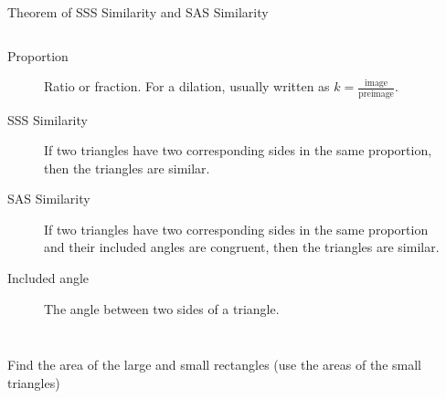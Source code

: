 \documentclass[onlytextwidth, aspectratio=169]{beamer}
\begin{document}
\begin{frame}{Theorem of SSS Similarity and SAS Similarity}
  \begin{columns}
      \begin{description}
        \item[Proportion] Ratio or fraction. For a dilation, usually written as $k=\frac{\text{image}}{\text{preimage}}$.
        \item[SSS Similarity] If two triangles have two corresponding sides in the same proportion, then the triangles are similar.
        \item[SAS Similarity] If two triangles have two corresponding sides in the same proportion and their included angles are congruent, then the triangles are similar.
        \item[Included angle] The angle between two sides of a triangle.
      \end{description}
    \begin{flushright}
    \end{flushright}
  \end{columns}
\end{frame}

\begin{frame}{Find the area of the large and small rectangles}
  {(use the areas of the small triangles)}
    \begin{flushright}
    \end{flushright}
\end{frame}
\end{document}

